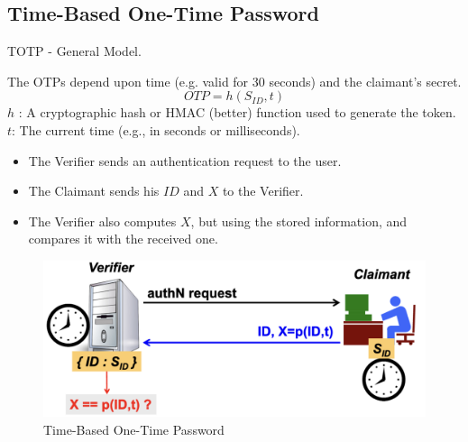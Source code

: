 \subsection{Time-Based One-Time Password}
\begin{center}
    TOTP - General Model.
\end{center}
The OTPs depend upon time (e.g. valid for 30 seconds) and the claimant's secret.
\[
    \boxed{OTP =h(S_{ID}, t)}
\]
$h$ : A cryptographic hash or HMAC (better) function used to generate the token.\\
$t$: The current time (e.g., in seconds or milliseconds).
\begin{multicols}{2}

    \begin{itemize}
        \item The Verifier sends an authentication request to the user.
        \item The Claimant sends his $ID$ and $X$ to the Verifier. 
        \item The Verifier also computes $X$, but using the stored information, and compares it with the received one.
    \end{itemize}
\columnbreak

    \begin{figure}[H]
        \centering
        \includegraphics[width=\linewidth]{Images/Authentication/totp.png}
        \caption{Time-Based One-Time Password}
    \end{figure}
\end{multicols}

